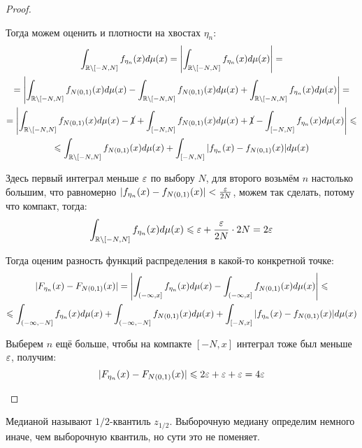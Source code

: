 \begin{proof}
\begin{itemize}
        Тогда можем оценить и плотности на хвостах $\eta_n$:
        \begin{multline*}
            \int_{\mathbb{R} \setminus [-N, N]} f_{\eta_n}(x) d\mu(x) = \left|\int_{\mathbb{R} \setminus [-N, N]} f_{\eta_n}(x) d\mu(x)\right| =
            \\
            = \left|\int_{\mathbb{R} \setminus [-N, N]} f_{N(0, 1)}(x) d\mu(x) - \int_{\mathbb{R} \setminus [-N, N]} f_{N(0, 1)}(x) d\mu(x) + \int_{\mathbb{R} \setminus [-N, N]} f_{\eta_n}(x) d\mu(x)\right| =
            \\
            = \left|\int_{\mathbb{R} \setminus [-N, N]} f_{N(0, 1)}(x) d\mu(x) - \cancel{1} + \int_{[-N, N]} f_{N(0, 1)}(x) d\mu(x) + \cancel{1} - \int_{[-N, N]} f_{\eta_n}(x) d\mu(x)\right| \leqslant
            \\
            \leqslant \int_{\mathbb{R} \setminus [-N, N]} f_{N(0, 1)}(x) d\mu(x) + \int_{[-N, N]} |f_{\eta_n}(x) - f_{N(0, 1)}(x)| d\mu(x)
        \end{multline*}

        Здесь первый интеграл меньше $\varepsilon$ по выбору $N$, для второго возьмём $n$ настолько большим, что равномерно $|f_{\eta_n}(x) - f_{N(0, 1)}(x)| < \frac{\varepsilon}{2N}$, можем так сделать, потому что компакт, тогда:
        \[
            \int_{\mathbb{R} \setminus [-N, N]} f_{\eta_n}(x) d\mu(x) \leqslant \varepsilon + \frac{\varepsilon}{2N} \cdot 2N = 2 \varepsilon
        \]

        Тогда оценим разность функций распределения в какой-то конкретной точке:
        \begin{multline*}
            | F_{\eta_n}(x) - F_{N(0, 1)}(x) | = \left|\int_{(-\infty, x]} f_{\eta_n}(x) d\mu(x) - \int_{(-\infty, x]} f_{N(0, 1)}(x) d\mu(x)\right| \leqslant
            \\
            \leqslant \int_{(-\infty, -N]} f_{\eta_n}(x) d\mu(x) + \int_{(-\infty, -N]} f_{N(0, 1)}(x) d\mu(x) + \int_{[-N, x]} |f_{\eta_n}(x) - f_{N(0, 1)}(x)| d\mu(x)
        \end{multline*}

        Выберем $n$ ещё больше, чтобы на компакте $[-N, x]$ интеграл тоже был меньше $\varepsilon$, получим:
        \[
            | F_{\eta_n}(x) - F_{N(0, 1)}(x) | \leqslant 2 \varepsilon + \varepsilon + \varepsilon = 4 \varepsilon
        \]
    \end{itemize}
\end{proof}

\begin{note}
    Медианой называют $1/2$-квантиль $z_{1/2}$. Выборочную медиану определим немного иначе, чем выборочную квантиль, но сути это не поменяет.
\end{note}

